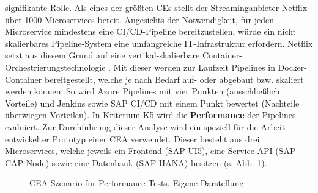 signifikante Rolle. Als eines der größten CEs stellt der Streaminganbieter Netflix über 1000 Microservices bereit. Angesichts der Notwendigkeit, für jeden Microservice mindestens eine CI/CD-Pipeline bereitzustellen, würde ein nicht skalierbares Pipeline-System eine umfangreiche IT-Infrastruktur erfordern. Netflix setzt aus diesem Grund auf eine vertikal-skalierbare Container-Orchestrierungstechnologie \cite{Blog.20170419}\cite{CloudZero.20230419}. Mit dieser werden zur Laufzeit Pipelines in Docker-Container bereitgestellt, welche je nach Bedarf auf- oder abgebaut bzw. skaliert werden können. So wird Azure Pipelines mit vier Punkten (ausschließlich Vorteile) und Jenkins sowie SAP CI/CD mit einem Punkt bewertet (Nachteile überwiegen Vorteilen). In Kriterium K5 wird die \textbf{Performance} der Pipelines evaluiert. Zur Durchführung dieser Analyse wird ein speziell für die Arbeit entwickelter Prototyp einer CEA verwendet. Dieser besteht aus drei Microservices, welche jeweils ein Frontend (SAP UI5), eine Service-API (SAP CAP Node) sowie eine Datenbank (SAP HANA) besitzen (s. Abb. \ref{fig:Szenario}).
 \begin{center}
	\begin{figure}[H]
		\centering
		\caption[CEA-Szenario für Performance-Tests]{CEA-Szenario für Performance-Tests. Eigene Darstellung.}
		\label{fig:Szenario}
	\end{figure}
\end{center}
\vspace*{-15mm}
